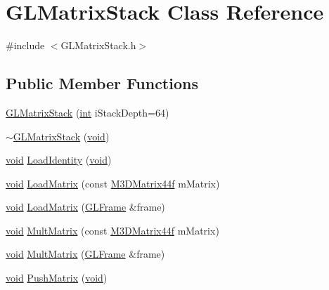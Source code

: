 \hypertarget{class_g_l_matrix_stack}{\section{G\-L\-Matrix\-Stack Class Reference}
\label{class_g_l_matrix_stack}
}


{\ttfamily \#include $<$G\-L\-Matrix\-Stack.\-h$>$}

\subsection*{Public Member Functions}
\begin{DoxyCompactItemize}
\item 
\hyperlink{class_g_l_matrix_stack_a89debc47d70ed2f917ade646750f5c90}{G\-L\-Matrix\-Stack} (\hyperlink{_s_d_l__thread_8h_a6a64f9be4433e4de6e2f2f548cf3c08e}{int} i\-Stack\-Depth=64)
\item 
\hyperlink{class_g_l_matrix_stack_aed9ec3a67a13615a2abc4c6852abe171}{$\sim$\-G\-L\-Matrix\-Stack} (\hyperlink{_s_d_l__opengl_8h_a3db05964a3cc4410f35b7ea2b7eb850d}{void})
\item 
\hyperlink{_s_d_l__opengl_8h_a3db05964a3cc4410f35b7ea2b7eb850d}{void} \hyperlink{class_g_l_matrix_stack_a679ef1d3a25f96e6cd2cd5e4f0a048dc}{Load\-Identity} (\hyperlink{_s_d_l__opengl_8h_a3db05964a3cc4410f35b7ea2b7eb850d}{void})
\item 
\hyperlink{_s_d_l__opengl_8h_a3db05964a3cc4410f35b7ea2b7eb850d}{void} \hyperlink{class_g_l_matrix_stack_a713df5b1bd052a38393abcc213b7cba4}{Load\-Matrix} (const \hyperlink{math3d_8h_a1e8690467d81d5ed97c5ecc3a144a4ac}{M3\-D\-Matrix44f} m\-Matrix)
\item 
\hyperlink{_s_d_l__opengl_8h_a3db05964a3cc4410f35b7ea2b7eb850d}{void} \hyperlink{class_g_l_matrix_stack_a3d285ec9916402c7d85b4f2bab399562}{Load\-Matrix} (\hyperlink{class_g_l_frame}{G\-L\-Frame} \&frame)
\item 
\hyperlink{_s_d_l__opengl_8h_a3db05964a3cc4410f35b7ea2b7eb850d}{void} \hyperlink{class_g_l_matrix_stack_a3ec7cd3cf8d27f22fb59a00022129b34}{Mult\-Matrix} (const \hyperlink{math3d_8h_a1e8690467d81d5ed97c5ecc3a144a4ac}{M3\-D\-Matrix44f} m\-Matrix)
\item 
\hyperlink{_s_d_l__opengl_8h_a3db05964a3cc4410f35b7ea2b7eb850d}{void} \hyperlink{class_g_l_matrix_stack_ac0ca60c3603dcf92cb3a2a400d726ed3}{Mult\-Matrix} (\hyperlink{class_g_l_frame}{G\-L\-Frame} \&frame)
\item 
\hyperlink{_s_d_l__opengl_8h_a3db05964a3cc4410f35b7ea2b7eb850d}{void} \hyperlink{class_g_l_matrix_stack_a24f0a7d30e49460f658b353f169aa412}{Push\-Matrix} (\hyperlink{_s_d_l__opengl_8h_a3db05964a3cc4410f35b7ea2b7eb850d}{void})

\end{DoxyCompactItemize}
